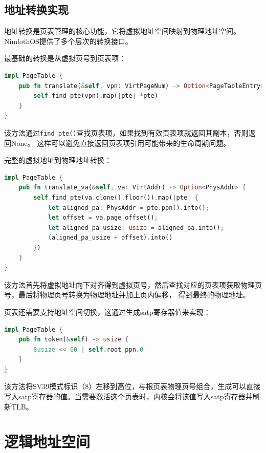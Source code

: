 \subsection{地址转换实现}

地址转换是页表管理的核心功能，它将虚拟地址空间映射到物理地址空间。NimlothOS提供了多个层次的转换接口。

最基础的转换是从虚拟页号到页表项：

\begin{lstlisting}[language=Rust,caption={虚拟页号转换}, label={lst:vpn-translate}]
impl PageTable {
    pub fn translate(&self, vpn: VirtPageNum) -> Option<PageTableEntry> {
        self.find_pte(vpn).map(|pte| *pte)
    }
}
\end{lstlisting}

该方法通过\lstinline[language=Rust]{find_pte()}查找页表项，如果找到有效页表项就返回其副本，否则返回None。
这样可以避免直接返回页表项引用可能带来的生命周期问题。

完整的虚拟地址到物理地址转换：

\begin{lstlisting}[language=Rust,caption={虚拟地址转换}, label={lst:va-translate}]
impl PageTable {
    pub fn translate_va(&self, va: VirtAddr) -> Option<PhysAddr> {
        self.find_pte(va.clone().floor()).map(|pte| {
            let aligned_pa: PhysAddr = pte.ppn().into();
            let offset = va.page_offset();
            let aligned_pa_usize: usize = aligned_pa.into();
            (aligned_pa_usize + offset).into()
        })
    }
}
\end{lstlisting}

该方法首先将虚拟地址向下对齐得到虚拟页号，然后查找对应的页表项获取物理页号，最后将物理页号转换为物理地址并加上页内偏移，
得到最终的物理地址。

页表还需要支持地址空间切换，这通过生成satp寄存器值来实现：

\begin{lstlisting}[language=Rust,caption={satp寄存器值生成}, label={lst:satp-token}]
impl PageTable {
    pub fn token(&self) -> usize {
        8usize << 60 | self.root_ppn.0
    }
}
\end{lstlisting}

该方法将SV39模式标识（8）左移到高位，与根页表物理页号组合，生成可以直接写入satp寄存器的值。当需要激活这个页表时，内核会将该值写入satp寄存器并刷新TLB。

\section{逻辑地址空间}

